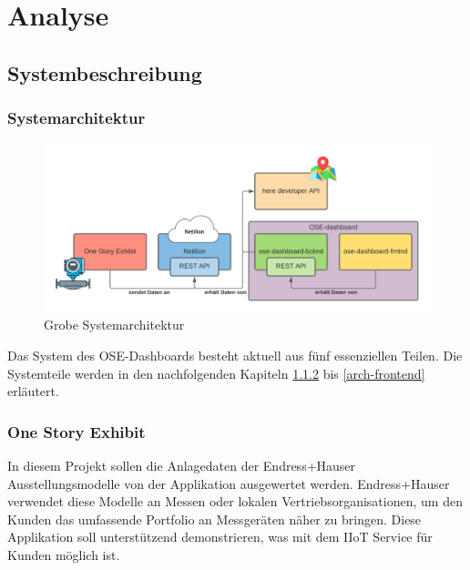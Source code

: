 
\chapter{Analyse}
\section{Systembeschreibung}
\subsection{Systemarchitektur}
\begin{figure}[!ht]
  \centering
  \includegraphics[width=1\linewidth]{./images/system.png}
  \caption[Eine von mir mit Lucidchart erstellte grobe Systemarchitektur]{Grobe Systemarchitektur}
  \label{fig:systemarchitektur}
\end{figure}
\cite{flaticon}
Das System des OSE-Dashboards besteht aktuell aus fünf essenziellen Teilen. Die Systemteile werden in den nachfolgenden Kapiteln \ref{arch-ose} bis \ref{arch-frontend} erläutert.
\subsection{One Story Exhibit} \label{arch-ose}
In diesem Projekt sollen die Anlagedaten der Endress+Hauser Ausstellungsmodelle von der Applikation ausgewertet werden. Endress+Hauser verwendet diese Modelle an Messen oder lokalen Vertriebsorganisationen, um den Kunden das umfassende Portfolio an Messgeräten näher zu bringen. Diese Applikation soll unterstützend demonstrieren, was mit dem IIoT Service  für Kunden möglich ist.
